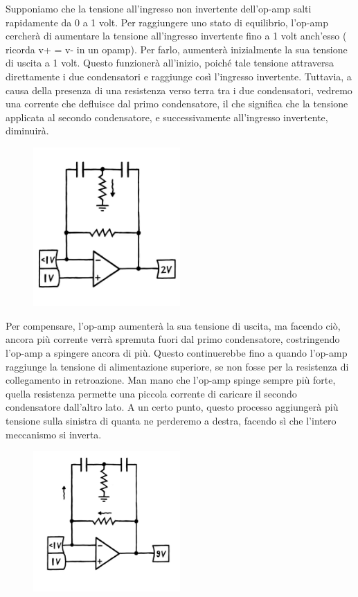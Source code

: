 \documentclass{article}
\begin{document}
 Supponiamo che la tensione all’ingresso non invertente dell’op-amp salti rapidamente da 0 a 1 volt. Per raggiungere uno stato di equilibrio, l’op-amp cercherà di aumentare la tensione all’ingresso invertente fino a 1 volt anch'esso ( ricorda v+ = v- in un opamp). Per farlo, aumenterà inizialmente la sua tensione di uscita a 1 volt. Questo funzionerà all’inizio, poiché tale tensione attraversa direttamente i due condensatori e raggiunge così l’ingresso invertente. Tuttavia, a causa della presenza di una resistenza verso terra tra i due condensatori, vedremo una corrente che defluisce dal primo condensatore, il che significa che la tensione applicata al secondo condensatore, e successivamente all’ingresso invertente, diminuirà.

\begin{figure}[h]
    \centering
    \includegraphics[width=0.5\textwidth]{Toscillator2.png} 
    \label{fig:label}
\end{figure}

Per compensare, l’op-amp aumenterà la sua tensione di uscita, ma facendo ciò, ancora più corrente verrà spremuta fuori dal primo condensatore, costringendo l’op-amp a spingere ancora di più. Questo continuerebbe fino a quando l’op-amp raggiunge la tensione di alimentazione superiore, se non fosse per la resistenza di collegamento in retroazione. Man mano che l’op-amp spinge sempre più forte, quella resistenza permette una piccola corrente di caricare il secondo condensatore dall’altro lato. A un certo punto, questo processo aggiungerà più tensione sulla sinistra di quanta ne perderemo a destra, facendo sì che l’intero meccanismo si inverta.

\begin{figure}[h]
    \centering
    \includegraphics[width=0.5\textwidth]{Toscillator3.png} 
    \label{fig:label}
\end{figure}
\end{document}
